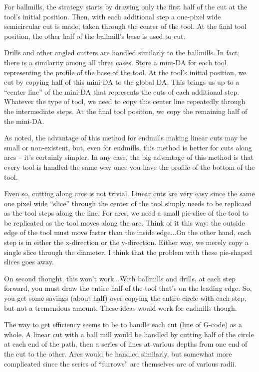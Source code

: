 \documentclass[titlepage,oneside,10pt]{article}
\begin{document}
For ballmills, the strategy starts by drawing only the first half of
the cut at the tool's initial position. Then, with each additional
step a one-pixel wide semicircular cut is made, taken through the
center of the tool. At the final tool position, the other half of the
ballmill's base is used to cut.

Drills and other angled cutters are handled similarly to the
ballmills. In fact, there is a similarity among all three cases. Store
a mini-DA for each tool representing the profile of the base of the
tool. At the tool's initial position, we cut by copying half of this
mini-DA to the global DA. This brings us up to a ``center line'' of
the mini-DA that represents the cuts of each additional step. Whatever
the type of tool, we need to copy this center line repeatedly through
the intermediate steps. At the final tool position, we copy the
remaining half of the mini-DA.

As noted, the advantage of this method for endmills making linear cuts
may be small or non-existent, but, even for endmills, this method is
better for cuts along arcs -- it's certainly simpler. In any case, the
big advantage of this method is that every tool is handled the same
way once you have the profile of the bottom of the tool.

Even so, cutting along arcs is not trivial. Linear cuts {\emph are}
very easy since the same one pixel wide ``slice'' through the center
of the tool simply needs to be replicaed as the tool steps along the
line. For arcs, we need a small pie-slice of the tool to be replicated
as the tool moves along the arc. Think of it this way: the outside
edge of the tool must move faster than the inside edge...On the other
hand, each step is in either the x-direction or the
y-direction. Either way, we merely copy a single slice through the
diameter. I think that the problem with these pie-shaped slices goes
away.

On second thought, this won't work...With ballmills and drills, at
each step forward, you must draw the entire half of the tool that's on
the leading edge. So, you get some savings (about half) over copying
the entire circle with each step, but not a tremendous amount. These
ideas would work for endmills though.

The way to get efficiency seems to be to handle each cut (line of
G-code) as a whole. A linear cut with a ball mill would be handled by
cutting half of the circle at each end of the path, then a series of
lines at various depths from one end of the cut to the other. Arcs
would be handled similarly, but somewhat more complicated since the
series of ``furrows'' are themselves arc of various radii.
\end{document}
